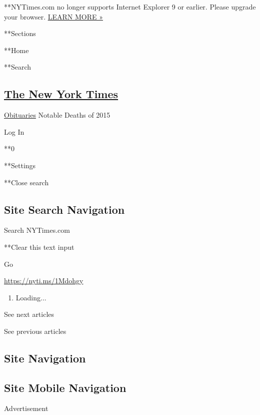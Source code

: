 **NYTimes.com no longer supports Internet Explorer 9 or earlier. Please
upgrade your browser.
\href{http://www.nytimes.com/content/help/site/ie9-support.html}{LEARN
MORE »}

**Sections

**Home

**Search

\hypertarget{the-new-york-times}{%
\subsection{\texorpdfstring{\href{http://www.nytimes.com/}{The New York
Times}}{The New York Times}}\label{the-new-york-times}}

 \href{https://www.nytimes.com/section/obituaries}{Obituaries}
\textbar{}Notable Deaths of 2015

Log In

**0

**Settings

**Close search

\hypertarget{site-search-navigation}{%
\subsection{Site Search Navigation}\label{site-search-navigation}}

Search NYTimes.com

**Clear this text input

Go

\url{https://nyti.ms/1Mdohgy}

\begin{enumerate}
\def\labelenumi{\arabic{enumi}.}
\item
  Loading...
\end{enumerate}

See next articles

See previous articles

\hypertarget{site-navigation}{%
\subsection{Site Navigation}\label{site-navigation}}

\hypertarget{site-mobile-navigation}{%
\subsection{Site Mobile Navigation}\label{site-mobile-navigation}}

Advertisement

